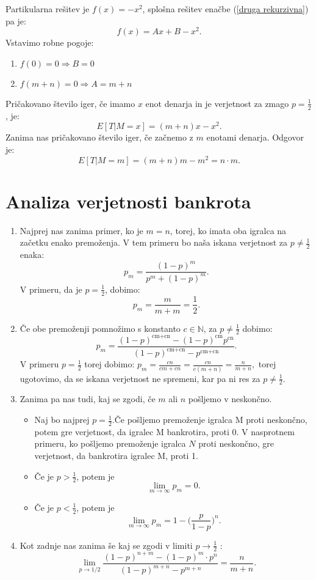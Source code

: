 \documentclass[12pt, a4paper]{article}
\begin{document}
Partikularna rešitev je $f(x)=-x^2$, splošna rešitev enačbe (\ref{druga rekurzivna}) pa je: $$f(x)=Ax+B-x^2.$$
Vstavimo robne pogoje:
\begin{enumerate}
\item $f(0)=0\Rightarrow B = 0$
\item $f(m+n)=0 \Rightarrow A = m+n$
\end{enumerate}
Pričakovano število iger, če imamo $x$ enot denarja in je verjetnost za zmago $p=\frac{1}{2}$, je: $$E[T|M=x]= (m+n)x-x^2.$$
Zanima nas pričakovano število iger, če začnemo z $m$ enotami denarja. Odgovor je:$$E[T|M=m]=(m+n)m-m^2= n\cdot m.$$

\newpage

\section{Analiza verjetnosti bankrota}

\begin{enumerate}
\item Najprej nas zanima primer, ko je $m = n$, torej, ko imata oba igralca na začetku enako premoženja. V tem primeru bo naša iskana verjetnost za $p \neq \frac{1}{2}$ enaka: 
$$p_m = \frac{(1-p)^m}{p^m+(1-p)^m}.$$
V primeru, da je $p = \frac{1}{2}$, dobimo: 
$$p_m = \frac{m}{m + m} = \frac{1}{2}.$$

\item Če obe premoženji pomnožimo s konstanto $c \in  \mathbb{N}$, za $p \neq \frac{1}{2}$ dobimo:
$$p_m = \frac{(1-p)^{\text{cm}+\text{cn}}-(1-p)^{\text{cm}} p^{\text{cn}}}{(1-p)^{\text{cm}+\text{cn}}-p^{\text{cm}+\text{cn}}}.$$
V primeru $p = \frac{1}{2}$ torej dobimo: 
$p_m = \frac{cn}{cm + cn} = \frac{cn}{c(m + n)} = \frac{n}{m + n},$ torej ugotovimo, da se iskana verjetnost ne spremeni, kar pa ni res za $p \neq \frac{1}{2}$.

\item Zanima pa nas tudi, kaj se zgodi, če $m$ ali $n$ pošljemo v neskončno. 
\begin{itemize}
\item Naj bo najprej $p = \frac{1}{2}$.Če pošljemo premoženje igralca M proti neskončno, potem gre verjetnost, da igralec M bankrotira, proti 0. V nasprotnem primeru, ko pošljemo premoženje igralca $N$ proti neskončno, gre verjetnost, da bankrotira igralec M, proti 1.
\item Če je $p > \frac{1}{2}$, potem je 
$$\lim_{m \to \infty} p_m = 0.$$
\item Če je $p < \frac{1}{2}$, potem je 
$$\lim_{m \to \infty} p_m = 1 - \Big(\frac{p}{1-p}\Big)^n.$$
\end{itemize}

\item Kot zadnje nas zanima še kaj se zgodi v limiti $ p \to \frac{1}{2}$ :
$$ \lim_{p \to 1/2}  \frac{(1-p)^{n+m} - (1-p)^m \cdot p^n}{(1-p)^{m+n} - p^{m+n}}  =\frac{n}{m + n}.$$

\end{enumerate}
\end{document}
